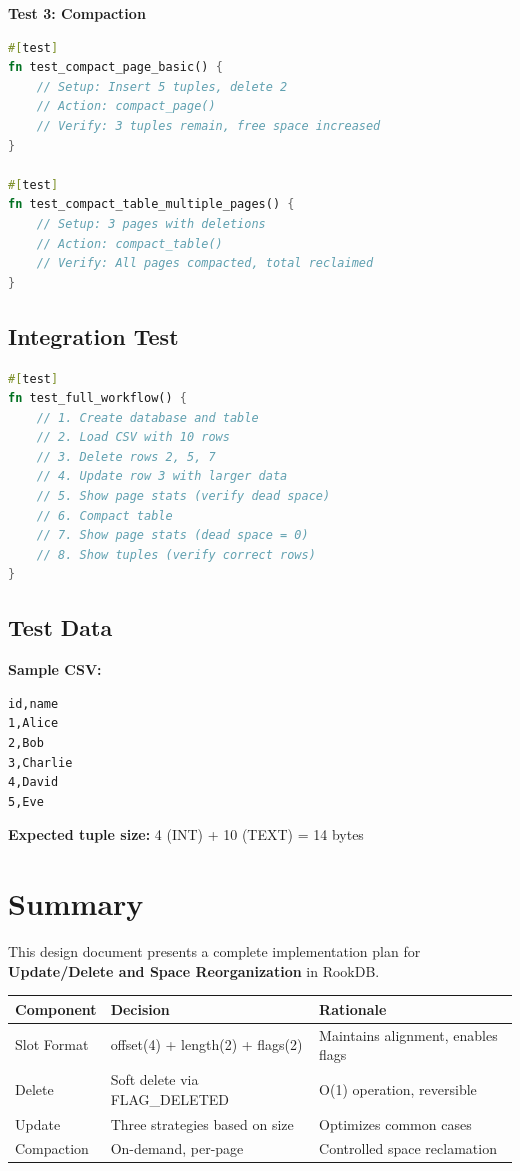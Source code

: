 \documentclass[11pt,a4paper]{article}
\begin{document}
\textbf{Test 3: Compaction}
\begin{lstlisting}[language=Rust]
#[test]
fn test_compact_page_basic() {
    // Setup: Insert 5 tuples, delete 2
    // Action: compact_page()
    // Verify: 3 tuples remain, free space increased
}

#[test]
fn test_compact_table_multiple_pages() {
    // Setup: 3 pages with deletions
    // Action: compact_table()
    // Verify: All pages compacted, total reclaimed
}
\end{lstlisting}

\subsection{Integration Test}

\begin{lstlisting}[language=Rust]
#[test]
fn test_full_workflow() {
    // 1. Create database and table
    // 2. Load CSV with 10 rows
    // 3. Delete rows 2, 5, 7
    // 4. Update row 3 with larger data
    // 5. Show page stats (verify dead space)
    // 6. Compact table
    // 7. Show page stats (dead space = 0)
    // 8. Show tuples (verify correct rows)
}
\end{lstlisting}

\subsection{Test Data}

\textbf{Sample CSV:}
\begin{lstlisting}
id,name
1,Alice
2,Bob
3,Charlie
4,David
5,Eve
\end{lstlisting}

\textbf{Expected tuple size:} 4 (INT) + 10 (TEXT) = 14 bytes

\section*{Summary}

This design document presents a complete implementation plan for \textbf{Update/Delete and Space Reorganization} in RookDB.

\begin{table}[H]
\centering
\begin{tabular}{@{}lll@{}}
\toprule
\textbf{Component} & \textbf{Decision} & \textbf{Rationale} \\
\midrule
Slot Format & offset(4) + length(2) + flags(2) & Maintains alignment, enables flags \\
Delete & Soft delete via FLAG\_DELETED & O(1) operation, reversible \\
Update & Three strategies based on size & Optimizes common cases \\
Compaction & On-demand, per-page & Controlled space reclamation \\
\bottomrule
\end{tabular}
\end{table}
\end{document}
